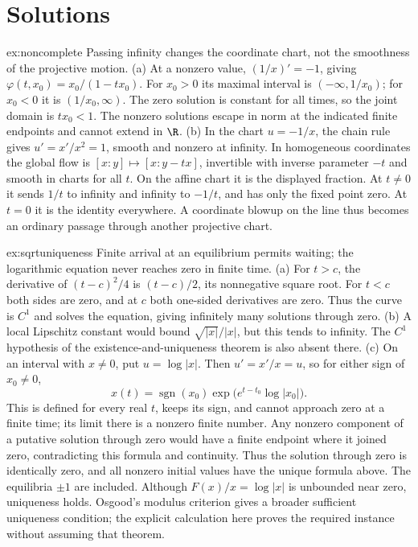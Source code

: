 \section{Solutions}

\begin{solution}{ex:noncomplete}
\idea Passing infinity changes the coordinate chart, not the smoothness of the projective motion.
\writeup (a) At a nonzero value, $(1/x)'=-1$, giving $\varphi(t,x_0)=x_0/(1-tx_0)$. For $x_0>0$ its maximal interval is $(-\infty,1/x_0)$; for $x_0<0$ it is $(1/x_0,\infty)$. The zero solution is constant for all times, so the joint domain is $tx_0<1$. The nonzero solutions escape in norm at the indicated finite endpoints and cannot extend in $\R$.
(b) In the chart $u=-1/x$, the chain rule gives $u'=x'/x^2=1$, smooth and nonzero at infinity. In homogeneous coordinates the global flow is
$[x:y]\mapsto[x:y-tx]$, invertible with inverse parameter $-t$ and smooth in charts for all $t$. On the affine chart it is the displayed fraction. At $t\ne0$ it sends $1/t$ to infinity and infinity to $-1/t$, and has only the fixed point zero. At $t=0$ it is the identity everywhere. A coordinate blowup on the line thus becomes an ordinary passage through another projective chart.
\end{solution}

\begin{solution}{ex:sqrtuniqueness}
\idea Finite arrival at an equilibrium permits waiting; the logarithmic equation never reaches zero in finite time.
\writeup (a) For $t>c$, the derivative of $(t-c)^2/4$ is $(t-c)/2$, its nonnegative square root. For $t<c$ both sides are zero, and at $c$ both one-sided derivatives are zero. Thus the curve is $C^1$ and solves the equation, giving infinitely many solutions through zero.
(b) A local Lipschitz constant would bound $\sqrt{|x|}/|x|$, but this tends to infinity. The $C^1$ hypothesis of the existence-and-uniqueness theorem is also absent there.
(c) On an interval with $x\ne0$, put $u=\log|x|$. Then $u'=x'/x=u$, so for either sign of $x_0\ne0$,
\[
x(t)=\operatorname{sgn}(x_0)\exp\bigl(e^{t-t_0}\log|x_0|\bigr).
\]
This is defined for every real $t$, keeps its sign, and cannot approach zero at a finite time; its limit there is a nonzero finite number. Any nonzero component of a putative solution through zero would have a finite endpoint where it joined zero, contradicting this formula and continuity. Thus the solution through zero is identically zero, and all nonzero initial values have the unique formula above. The equilibria $\pm1$ are included. Although $F(x)/x=\log|x|$ is unbounded near zero, uniqueness holds. Osgood's modulus criterion gives a broader sufficient uniqueness condition; the explicit calculation here proves the required instance without assuming that theorem.
\end{solution}

